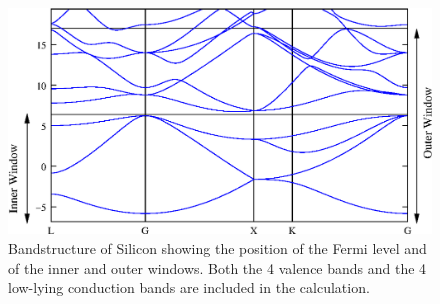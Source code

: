 \begin{enumerate}
	\begin{figure}[t!]
	\centering
	\includegraphics[width=0.7\columnwidth]{figure/example03/si.eps}
	\caption{Bandstructure of Silicon showing the position of the Fermi level and of the inner and outer windows. Both the 4 valence bands and the 4 low-lying conduction bands are included in the calculation.}\label{fig3.1}
	\end{figure}


\end{enumerate}
